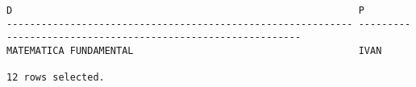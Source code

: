 \documentclass[11pt]{report}
\begin{document}
\begin{itemize}
\begin{verbatim}
D                                                            P                                                                                                                      
------------------------------------------------------------ ------------------------------------------------------------                                                           
MATEMATICA FUNDAMENTAL                                       IVAN                                                                                                                   

12 rows selected.
  \end{verbatim}
\end{itemize}
\end{document}

